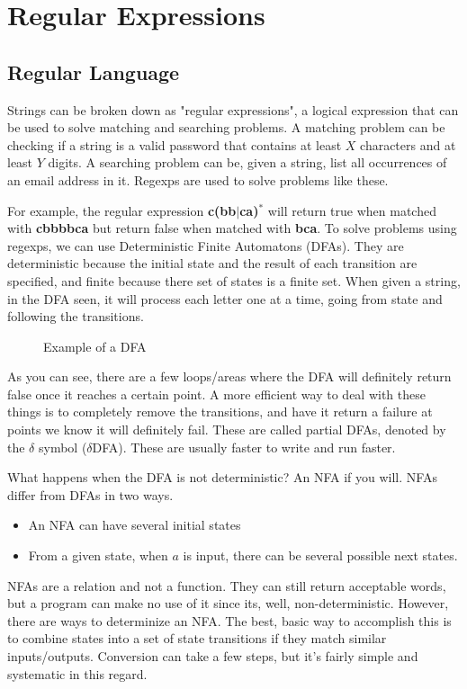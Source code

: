 \section{Regular Expressions}
\subsection{Regular Language}
Strings can be broken down as "regular expressions", a logical expression that can be used to solve matching and searching problems. A matching problem can be checking if a string is a valid password that contains at least $X$ characters and at least $Y$ digits. A searching problem can be, given a string, list all occurrences of an email address in it. Regexps are used to solve problems like these.

For example, the regular expression \textbf{c(bb$|$ca)$^*$} will return true when matched with \textbf{cbbbbca} but return false when matched with \textbf{bca}. To solve problems using regexps, we can use Deterministic Finite Automatons (DFAs). They are deterministic because the initial state and the result of each transition are specified, and finite because there set of states is a finite set. When given a string, in the DFA seen, it will process each letter one at a time, going from state and following the transitions.

\begin{figure}[!htb]
	\caption{\label{fig:dfa} Example of a DFA}
\end{figure}

As you can see, there are a few loops/areas where the DFA will definitely return false once it reaches a certain point. A more efficient way to deal with these things is to completely remove the transitions, and have it return a failure at points we know it will definitely fail. These are called partial DFAs, denoted by the $\delta$ symbol ($\delta$DFA). These are usually faster to write and run faster.

What happens when the DFA is not deterministic? An NFA if you will. NFAs differ from DFAs in two ways.
\begin{itemize}
	\item An NFA can have several initial states
	\item From a given state, when $a$ is input, there can be several possible next states.
\end{itemize}
NFAs are a relation and not a function. They can still return acceptable words, but a program can make no use of it since its, well, non-deterministic. However, there are ways to determinize an NFA. The best, basic way to accomplish this is to combine states into a set of state transitions if they match similar inputs/outputs. Conversion can take a few steps, but it's fairly simple and systematic in this regard.

